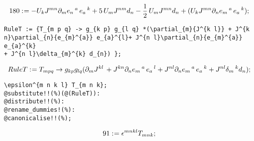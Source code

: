 \documentclass[11pt]{article}
\def\specialcolon{\mathrel{\mathop{:}}\hspace{-.5em}}
\begin{document}
\begin{dmath*}[compact, spread=2pt]
180\specialcolon{}=  - {U}_{k} {J}^{m n} {\partial}_{m}{{e}_{n}\,^{a}}\,  {e}_{a}\,^{k} + 5\, {U}_{m} {J}^{n m} {d}_{n} - \frac{1}{2}\, {U}_{m} {J}^{m n} {d}_{n} + ({U}_{k} {J}^{m n} {\partial}_{n}{{e}_{m}\,^{a}}\,  {e}_{a}\,^{k});
\end{dmath*}
{\color[named]{Blue}\begin{verbatim}
RuleT := {T_{m p q} -> g_{k p} g_{l q} *(\partial_{m}{J^{k l}} + J^{k n}\partial_{n}{e_{m}^{a}} e_{a}^{l}+ J^{n l}\partial_{n}{e_{m}^{a}} e_{a}^{k} 
+ J^{n l}\delta_{m}^{k} d_{n}) };
\end{verbatim}}














\begin{dmath*}[compact, spread=2pt]
RuleT\specialcolon{}= {T}_{m p q} \rightarrow {g}_{k p} {g}_{l q} ({\partial}_{m}{{J}^{k l}}\,  + {J}^{k n} {\partial}_{n}{{e}_{m}\,^{a}}\,  {e}_{a}\,^{l} + {J}^{n l} {\partial}_{n}{{e}_{m}\,^{a}}\,  {e}_{a}\,^{k} + {J}^{n l} {\delta}_{m}\,^{k} {d}_{n});
\end{dmath*}
{\color[named]{Blue}\begin{verbatim}
\epsilon^{m n k l} T_{m n k};
@substitute!!(%)(@(RuleT)):
@distribute!!(%):
@rename_dummies!(%):
@canonicalise!!(%);
\end{verbatim}}














\begin{dmath*}[compact, spread=2pt]
91\specialcolon{}= {\epsilon}^{m n k l} {T}_{m n k};
\end{dmath*}
\end{document}
